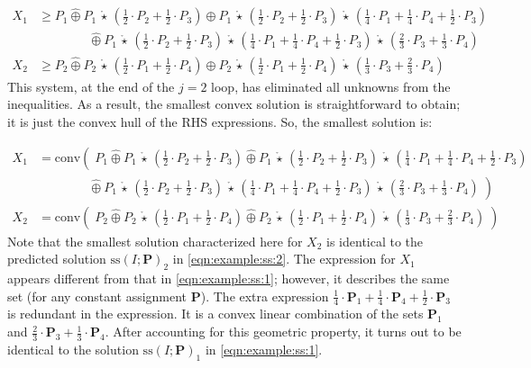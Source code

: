 \documentclass[10pt]{amsart}
\theoremstyle{plain}
\theoremstyle{definition}
\providecommand{\bP}[0]{\ensuremath{\mathbf P}\xspace}
\let\geq\geqslant
\providecommand{\cplus}[0]{\ensuremath{\hat{\oplus}}\xspace}
\providecommand{\cmult}[0]{\ensuremath{{\,\mathring{\star}\,}}\xspace}
\providecommand{\conv}[1]{\ensuremath{\mathrm{conv}{\left({#1}\right)}\xspace}}
\providecommand{\ssol}{\ensuremath{\mathrm{ss}}\xspace}
\begin{document}
    \begin{align*}
        X_1 &\geq P_1 \cplus P_1\cmult\left(\frac12\cdot P_2 + \frac12\cdot P_3\right) \cplus P_1\cmult\left(\frac12\cdot P_2 + \frac12\cdot P_3\right)\cmult\left(\frac14\cdot P_1+\frac14\cdot P_4+\frac12\cdot P_3\right)\\
            &\qquad\qquad \cplus P_1\cmult\left(\frac12\cdot P_2 + \frac12\cdot P_3\right)\cmult\left(\frac14\cdot P_1+\frac14\cdot P_4+\frac12\cdot P_3\right)\cmult\left(\frac23\cdot P_3 + \frac13\cdot P_4\right)\\
        X_2 &\geq P_2 \cplus P_2\cmult\left(\frac12\cdot P_1 + \frac12\cdot P_4\right) 
            \cplus P_2\cmult\left(\frac12\cdot P_1+\frac12\cdot P_4\right)\cmult \left(\frac13\cdot P_3 + \frac23\cdot P_4\right)
    \end{align*}
This system, at the end of the $j=2$ loop, has eliminated all unknowns from the inequalities. 
As a result, the smallest convex solution is straightforward to obtain; it is just the convex hull of the RHS expressions.
So, the smallest solution is:

    \begin{align*}
        X_1 &= \mathrm{conv}\left(\; P_1 \cplus P_1\cmult\left(\frac12\cdot P_2 + \frac12\cdot P_3\right) \cplus P_1\cmult\left(\frac12\cdot P_2 + \frac12\cdot P_3\right)\cmult\left(\frac14\cdot P_1+\frac14\cdot P_4+\frac12\cdot P_3\right) \right.\\
            &\qquad\qquad \left. \cplus P_1\cmult\left(\frac12\cdot P_2 + \frac12\cdot P_3\right)\cmult\left(\frac14\cdot P_1+\frac14\cdot P_4+\frac12\cdot P_3\right)\cmult\left(\frac23\cdot P_3 + \frac13\cdot P_4\right) \;\right)\\
        X_2 &=\conv{\; P_2 \cplus P_2\cmult\left(\frac12\cdot P_1 + \frac12\cdot P_4\right) 
            \cplus P_2\cmult\left(\frac12\cdot P_1+\frac12\cdot P_4\right)\cmult \left(\frac13\cdot P_3 + \frac23\cdot P_4\right) \;}
    \end{align*}
Note that the smallest solution characterized here for $X_2$ is identical to the predicted solution $\ssol(I;\bP)_2$ in 
\eqref{eqn:example:ss:2}.
The expression for $X_1$ appears different from that in 
\eqref{eqn:example:ss:1}; however, it describes the same set (for any constant assignment $\bP$). 
The extra expression $\frac14\cdot \bP_1 + \frac14\cdot \bP_4 + \frac12\cdot \bP_3$ is redundant in the expression. 
It is a convex linear combination of the sets $\bP_1$ and $\frac23\cdot \bP_3 + \frac13\cdot \bP_4$. 
After accounting for this geometric property, it turns out to be identical to the solution $\ssol(I;\bP)_1$ 
in \eqref{eqn:example:ss:1}.
\end{document}
